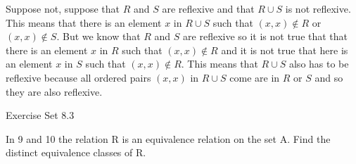\documentclass[12pt,letterpaper, onecolumn]{exam}
\begin{document}
\begin{questions}
	\begin{solution}
	Suppose not, suppose that $R$ and $S$ are reflexive and that $R\cup S$ is not reflexive. This means that there is an element $x$ in $R\cup S$ such that $(x,x) \notin R$ or $(x,x)\notin S$. But we know that $R$ and $S$ are reflexive so it is not true that that there is an element $x$ in $R$ such that $(x,x)\notin R$ and it is not true that here is an element $x$ in $S$ such that $(x,x)\notin R$. This means that $R\cup S$ also has to be reflexive because all ordered pairs $(x,x)$ in $R\cup S$ come are in $R$ or $S$ and so they are also reflexive.
	\end{solution}
	\end{questions}
	\pagebreak
	\centerline{Exercise Set 8.3}
		   In 9 and 10 the relation R is an equivalence relation on the set A. Find the distinct equivalence classes of R.\\
\end{document}
